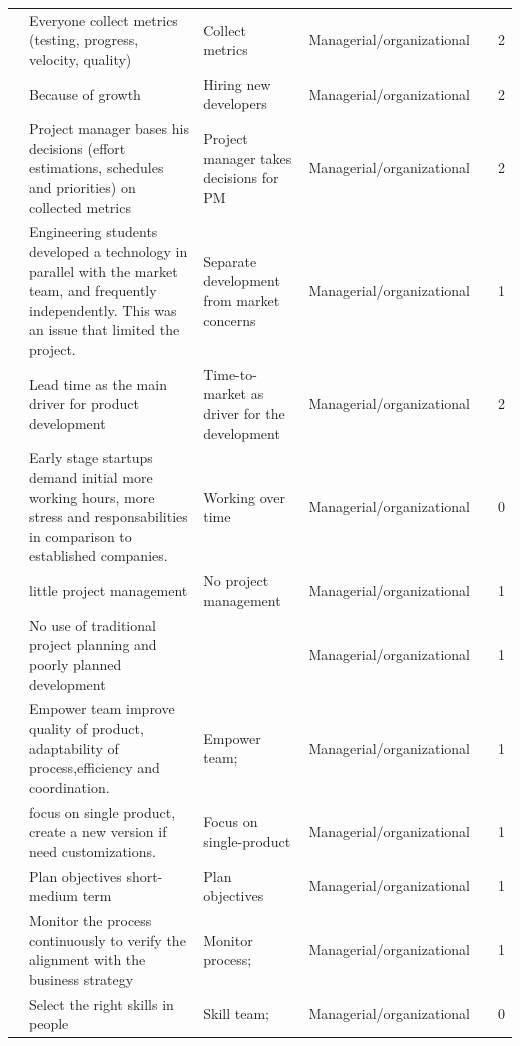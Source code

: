 \documentclass[final,5p,times,twocolumn]{elsarticle}
\begin{document}
\begin{center}
\begin{longtable}{|p{0.36in}|p{2.6in}|p{1.2in}|p{0.9in}|p{0.9in}|p{0.2in}|}
\cite{Zettel2001} & Everyone collect metrics (testing, progress, velocity, quality) & Collect metrics & Managerial/organizational &       & 2 \\
\cite{Ambler2002} & Because of growth & Hiring new developers & Managerial/organizational &       & 2 \\
\cite{Zettel2001} & Project manager bases his decisions (effort estimations, schedules and priorities) on collected metrics & Project manager takes decisions for PM & Managerial/organizational &       & 2 \\
\cite{Stanfill2007} & Engineering students developed a technology in parallel with the market team, and frequently independently. This was an issue that limited the project. & Separate development from market concerns & Managerial/organizational &       & 1 \\
\cite{Hilmola2003} & Lead time as the main driver for product development & Time-to-market as driver for the development & Managerial/organizational &       & 2 \\
\cite{Tanabian2005} & Early stage startups demand initial more working hours, more stress and responsabilities in comparison to established companies. & Working over time & Managerial/organizational &       & 0 \\
\cite{Camel1994a} & little project management & No project management & Managerial/organizational &       & 1 \\
\cite{Camel1994a} & No use of traditional project planning and poorly planned development &       & Managerial/organizational &       & 1 \\
\cite{Sutton2000} & Empower team improve quality of product, adaptability of process,efficiency and coordination. & Empower team; & Managerial/organizational &       & 1 \\
\cite{Crowne2002} & focus on single product, create a new version if need customizations. & Focus on single-product & Managerial/organizational &       & 1 \\
\cite{Crowne2002} & Plan objectives short-medium term & Plan objectives & Managerial/organizational &       & 1 \\
\cite{Yogendra2002} & Monitor the process continuously to verify the alignment with the business strategy & Monitor process; & Managerial/organizational &       & 1 \\
\cite{Steenhuis2008} & Select the right skills in people & Skill team; & Managerial/organizational &       & 0 \\

\end{longtable}
\end{center}
\end{document}
